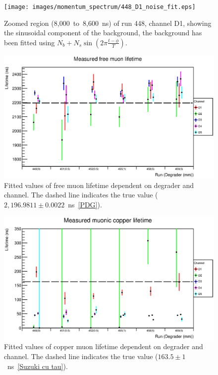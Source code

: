 \begin{figure}[hptb]
  \centering
    \texttt{[image: images/momentum\_spectrum/448\_D1\_noise\_fit.eps]}
  \caption{Zoomed region (8,000~to~8,600~ns) of run 448, channel D1, showing the sinusoidal component of the background, the background has been fitted using \(N_b + N_s\sin(2\pi\frac{t-\phi}{T})\).}
  \label{fig:images_momentum_spectrum_448_D1_noise_fit}
\end{figure}
\begin{figure}[hptb]
  \centering
    \includegraphics[width=.9\textwidth]{images/plot_generating_scripts/per_ch_free_lifetime.eps}
  \caption{Fitted values of free muon lifetime dependent on degrader and channel. The dashed line indicates the true value (\(2,196.9811\pm0.0022\)~ns~\ref{PDG}).}
  \label{fig:images_plot_generating_scripts_per_ch_free_lifetime}
\end{figure}
\begin{figure}[hptb]
  \centering
    \includegraphics[width=.9\textwidth]{images/plot_generating_scripts/per_ch_copper_lifetime.eps}
  \caption{Fitted values of copper muon lifetime dependent on degrader and channel. The dashed line indicates the true value (\(163.5\pm1\)~ns~\ref{Suzuki cu tau}).}
  \label{fig:images_plot_generating_scripts_per_ch_copper_lifetime}
\end{figure}


